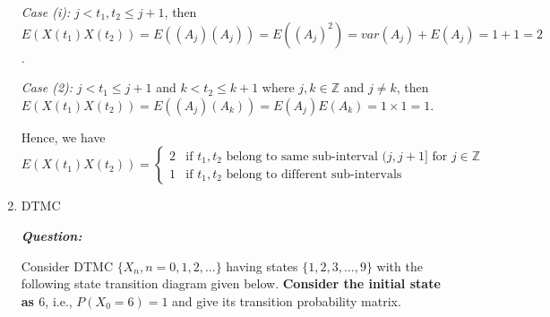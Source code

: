 \documentclass[12pt, oneside]{article}
\begin{document}
\begin{enumerate}
        \textit{Case (i): } $j< t_1,t_2 \le j+1$,  then $E(X(t_1)X(t_2)) = E((A_j)(A_j)) = E((A_j)^2) = var(A_j) + E(A_j) = 1+1 = 2$.
        
        \textit{Case (2): } $j< t_1 \le j+1$ and $k< t_2 \le k+1$ where $j,k\in\mathbb{Z}$ and $j\ne k$, then $E(X(t_1)X(t_2)) = E((A_j)(A_k)) = E(A_j)E(A_k) = 1 \times 1 = 1$.

Hence, we have 
\[ E(X(t_1)X(t_2)) = 
\begin{cases}
2 & \text{if } t_1,t_2 \text{ belong to same sub-interval } (j,j+1] \text{ for } j \in \mathbb{Z} \\
1 & \text{if } t_1,t_2 \text{ belong to different sub-intervals }
\end{cases}
\]
  
%
%    
    
    
    


\newpage
\item DTMC

\textbf{\textit{Question:}}

Consider DTMC $\{ X_n, n=0,1,2,\dots \}$ having states $\{1,2,3,\dots,9\}$ with the following state transition diagram given below. \textbf{Consider the initial state as $6$}, i.e., $P(X_0 = 6) = 1$ and give its transition probability matrix.

\begin{figure}[!h]
\centering
{}
\end{figure}
\end{enumerate}
\end{document}
